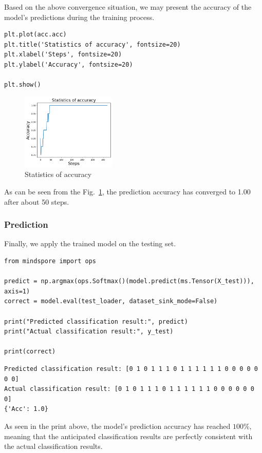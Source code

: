 Based on the above convergence situation, we may present the accuracy of the model's predictions during the training process. %

\begin{lstlisting}
plt.plot(acc.acc)
plt.title('Statistics of accuracy', fontsize=20)
plt.xlabel('Steps', fontsize=20)
plt.ylabel('Accuracy', fontsize=20)

plt.show()
\end{lstlisting}

\begin{figure}[H]
    \centering
    \includegraphics[width=0.4\textwidth]{5.1_figures/Statistics_of_accuracy.png}
    \caption{Statistics of accuracy}
    \label{5.1Statistics_of_accuracy}
\end{figure}

As can be seen from the Fig.~\ref{5.1Statistics_of_accuracy}, the prediction accuracy has converged to 1.00 after about 50 steps.

\subsubsection{Prediction}
Finally, we apply the trained model on the testing set.
\begin{lstlisting}
from mindspore import ops

predict = np.argmax(ops.Softmax()(model.predict(ms.Tensor(X_test))), axis=1)
correct = model.eval(test_loader, dataset_sink_mode=False)

print("Predicted classification result:", predict)
print("Actual classification result:", y_test)

print(correct)
\end{lstlisting}

\begin{lstlisting}
Predicted classification result: [0 1 0 1 1 1 0 1 1 1 1 1 1 0 0 0 0 0 0 0]
Actual classification result: [0 1 0 1 1 1 0 1 1 1 1 1 1 0 0 0 0 0 0 0]
{'Acc': 1.0}
\end{lstlisting}

As seen in the print above, the model's prediction accuracy has reached $100\%$, meaning that the anticipated classification results are perfectly consistent with the actual classification results.

